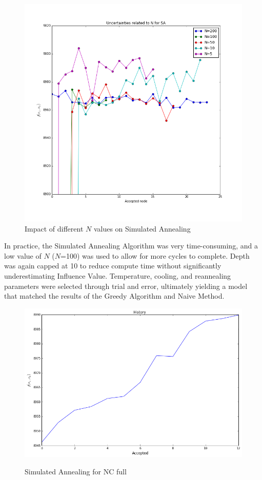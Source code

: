 \documentclass[11pt]{scrartcl} %
\begin{document}
\begin{enumerate}
\begin{figure}
\centering
\includegraphics[width=10 cm]{Uncertainties_SA}
\caption{Impact of different $N$ values on Simulated Annealing}
\label{fig:SA}
\end{figure}



In practice, the Simulated Annealing Algorithm was very time-consuming, and a low value of $N$ ($N$=100) was used to allow for more cycles to complete.  Depth was again capped at 10 to reduce compute time without significantly underestimating Influence Value.  Temperature, cooling, and reannealing parameters were selected through trial and error, ultimately yielding a model that matched the results of the Greedy Algorithm and Naive Method.  

\begin{figure}[h!]
\centering
\includegraphics[width=10 cm]{SimAnFull}
\label{fig_sim}
\caption{Simulated Annealing for NC full}
\label{fig:GA}
\end{figure}
\end{enumerate}
\end{document}
